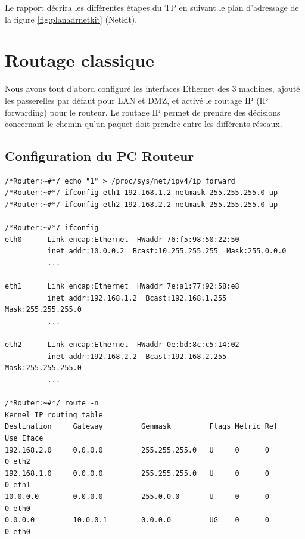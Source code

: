 \documentclass[frenchb, 11pt]{article}
\begin{document}
\begin{mdframed}[backgroundcolor=lightred, linecolor=darkred]
Le rapport décrira les différentes étapes du TP en suivant le plan d'adressage de la figure \ref{fig:planadrnetkit} (Netkit).
\end{mdframed}


\newpage

\section{Routage classique}
Nous avons tout d'abord configuré les interfaces Ethernet des 3 machines, ajouté les passerelles par défaut pour LAN et DMZ, et activé le routage IP (IP forwarding) pour le routeur. Le routage IP permet de prendre des décisions concernant le chemin qu'un paquet doit prendre entre les différents réseaux.

\subsection{Configuration du PC Routeur}
\begin{lstlisting}
/*Router:~#*/ echo "1" > /proc/sys/net/ipv4/ip_forward
/*Router:~#*/ ifconfig eth1 192.168.1.2 netmask 255.255.255.0 up
/*Router:~#*/ ifconfig eth2 192.168.2.2 netmask 255.255.255.0 up

/*Router:~#*/ ifconfig
eth0      Link encap:Ethernet  HWaddr 76:f5:98:50:22:50
          inet addr:10.0.0.2  Bcast:10.255.255.255  Mask:255.0.0.0
          ...

eth1      Link encap:Ethernet  HWaddr 7e:a1:77:92:58:e8
          inet addr:192.168.1.2  Bcast:192.168.1.255  Mask:255.255.255.0
          ...

eth2      Link encap:Ethernet  HWaddr 0e:bd:8c:c5:14:02
          inet addr:192.168.2.2  Bcast:192.168.2.255  Mask:255.255.255.0
          ...

/*Router:~#*/ route -n
Kernel IP routing table
Destination     Gateway         Genmask         Flags Metric Ref    Use Iface
192.168.2.0     0.0.0.0         255.255.255.0   U     0      0        0 eth2
192.168.1.0     0.0.0.0         255.255.255.0   U     0      0        0 eth1
10.0.0.0        0.0.0.0         255.0.0.0       U     0      0        0 eth0
0.0.0.0         10.0.0.1        0.0.0.0         UG    0      0        0 eth0
\end{lstlisting}
\hfill
\end{document}
